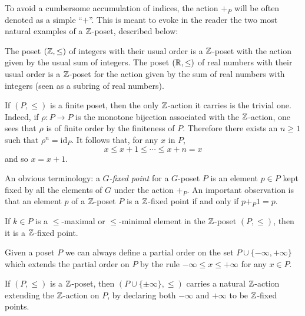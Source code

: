 \documentclass[a4paper,12pt]{amsart}
\begin{document}
\begin{notat}
To avoid a cumbersome accumulation of indices, the action $+_P$ will be often denoted as a simple ``$+$''. This is meant to evoke in the reader the two most natural examples of a $\mathbb{Z} $-poset, described below:
\end{notat}
\begin{example}The poset $(\mathbb{Z} ,\leq)$ of integers with their usual order is a $\mathbb{Z} $-poset with the action given by the usual sum of integers. The poset $(\mathbb{R},\leq)$ of real numbers with their usual order is a $\mathbb{Z} $-poset for the action given by the sum of real numbers with integers (seen as a subring of real numbers).
\end{example}
\begin{remark}\label{rem.finite}
 If $(P,\leq)$ is a finite poset, then the only $\mathbb{Z} $-action it carries is the trivial one. Indeed, if $\rho\colon P\to P$ is the monotone bijection associated with the $\mathbb{Z} $-action, one sees that $\rho$ is of finite order by the finiteness of $P$. Therefore there exists an $n\geq 1$ such that $\rho^n=\mathrm{id}_P$. It follows that, for any $x$ in $P$,
 \[
 x\leq x+1\leq\cdots\leq x+n=x
 \]
and so $x=x+1$.
\end{remark}
\begin{notat}
An obvious terminology: a \emph{$G$-fixed point} for a $G$-poset $P$ is an element $p\in P$ kept fixed by all the elements of $G$ under the action $+_P$. An important observation is that an element $p$ of a $\mathbb{Z}$-poset $P$ is a $\mathbb{Z}$-fixed point if and only if $p+_P 1 = p$.
\end{notat}
\begin{lemma}\label{minmax}
 If $k\in P$ is a $\le$-maximal or $\le$-minimal element in the $\mathbb{Z} $-poset $(P,\leq)$, then it is a $\mathbb{Z} $-fixed point.
\end{lemma}
\begin{remark}
 Given a poset $P$ we can always define a partial order on the set $P\cup\{-\infty,+\infty\}$ which extends the partial order on $P$ by the rule $-\infty\leq x\leq +\infty$ for any $x\in P$. 
\end{remark}
\begin{lemma}
 If $(P,\leq)$ is a $\mathbb{Z} $-poset, then $(P\cup\{\pm\infty\},\leq)$ carries a natural $\mathbb{Z} $-action extending the $\mathbb{Z} $-action on $P$, by declaring both $-\infty$ and $+\infty$ to be $\mathbb{Z} $-fixed points.
\end{lemma}
\end{document}
